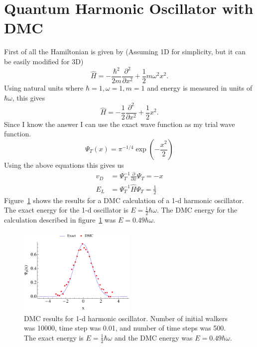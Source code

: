\section*{Quantum Harmonic Oscillator with DMC}
First of all the Hamiltonian is given by (Assuming 1D for simplicity, but it can be easily modified for 3D)
\begin{equation}
\hat{H}=- \frac{\hbar^2}{2 m}\frac{\partial^2}{\partial x^2}+\frac{1}{2}m \omega^2 x^2.
\end{equation}
Using natural units where $\hbar=1, \omega=1, m=1$ and energy is measured in units of $\hbar \omega$, this gives
\begin{equation}
\hat{H}=- \frac{1}{2}\frac{\partial^2}{\partial x^2}+\frac{1}{2}x^2.
\end{equation}
Since I know the answer I can use the exact wave function as my trial wave function.
\begin{equation}
  \Psi_T(x)=\pi^{-1/4}\exp{(-\frac{x^2}{2})}
\end{equation}
Using the above equations this gives us
\begin{equation}
  \begin{split}
    v_D &= \Psi_T^{-1}\frac{\partial}{\partial x} \Psi_T = -x \\
    E_L &= \Psi_T^{-1}\hat{H}\Psi_T = \frac{1}{2}
  \end{split}
\end{equation}
Figure~\ref{fig:1dho} shows the results for a DMC calculation of a 1-d harmonic oscillator. The exact energy for the 1-d oscillator is $E=\frac{1}{2}\hbar\omega$. The DMC energy for the calculation described in figure~\ref{fig:1dho} was $E=0.49\hbar\omega$.
\begin{figure}[h!]
  \centering
    \includegraphics[width=0.5\textwidth]{notexact}
    \caption{DMC results for 1-d harmonic oscillator. Number of initial walkers was 10000, time step was 0.01, and number of time steps was 500. The exact energy is $E=\frac{1}{2}\hbar\omega$ and the DMC energy was $E=0.49\hbar\omega$.}
    \label{fig:1dho}
\end{figure}
